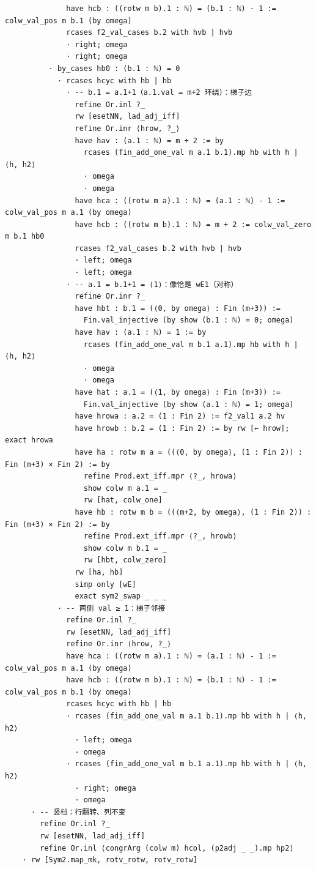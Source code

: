 \documentclass[11pt]{article}
\begin{document}
\begin{lstlisting}
              have hcb : ((rotw m b).1 : ℕ) = (b.1 : ℕ) - 1 := colw_val_pos m b.1 (by omega)
              rcases f2_val_cases b.2 with hvb | hvb
              · right; omega
              · right; omega
          · by_cases hb0 : (b.1 : ℕ) = 0
            · rcases hcyc with hb | hb
              · -- b.1 = a.1+1（a.1.val = m+2 环绕）：梯子边
                refine Or.inl ?_
                rw [esetNN, lad_adj_iff]
                refine Or.inr ⟨hrow, ?_⟩
                have hav : (a.1 : ℕ) = m + 2 := by
                  rcases (fin_add_one_val m a.1 b.1).mp hb with h | ⟨h, h2⟩
                  · omega
                  · omega
                have hca : ((rotw m a).1 : ℕ) = (a.1 : ℕ) - 1 := colw_val_pos m a.1 (by omega)
                have hcb : ((rotw m b).1 : ℕ) = m + 2 := colw_val_zero m b.1 hb0
                rcases f2_val_cases b.2 with hvb | hvb
                · left; omega
                · left; omega
              · -- a.1 = b.1+1 = ⟨1⟩：像恰是 wE1（对称）
                refine Or.inr ?_
                have hbt : b.1 = (⟨0, by omega⟩ : Fin (m+3)) :=
                  Fin.val_injective (by show (b.1 : ℕ) = 0; omega)
                have hav : (a.1 : ℕ) = 1 := by
                  rcases (fin_add_one_val m b.1 a.1).mp hb with h | ⟨h, h2⟩
                  · omega
                  · omega
                have hat : a.1 = (⟨1, by omega⟩ : Fin (m+3)) :=
                  Fin.val_injective (by show (a.1 : ℕ) = 1; omega)
                have hrowa : a.2 = (1 : Fin 2) := f2_val1 a.2 hv
                have hrowb : b.2 = (1 : Fin 2) := by rw [← hrow]; exact hrowa
                have ha : rotw m a = ((⟨0, by omega⟩, (1 : Fin 2)) : Fin (m+3) × Fin 2) := by
                  refine Prod.ext_iff.mpr ⟨?_, hrowa⟩
                  show colw m a.1 = _
                  rw [hat, colw_one]
                have hb : rotw m b = ((⟨m+2, by omega⟩, (1 : Fin 2)) : Fin (m+3) × Fin 2) := by
                  refine Prod.ext_iff.mpr ⟨?_, hrowb⟩
                  show colw m b.1 = _
                  rw [hbt, colw_zero]
                rw [ha, hb]
                simp only [wE]
                exact sym2_swap _ _ _
            · -- 两侧 val ≥ 1：梯子邻接
              refine Or.inl ?_
              rw [esetNN, lad_adj_iff]
              refine Or.inr ⟨hrow, ?_⟩
              have hca : ((rotw m a).1 : ℕ) = (a.1 : ℕ) - 1 := colw_val_pos m a.1 (by omega)
              have hcb : ((rotw m b).1 : ℕ) = (b.1 : ℕ) - 1 := colw_val_pos m b.1 (by omega)
              rcases hcyc with hb | hb
              · rcases (fin_add_one_val m a.1 b.1).mp hb with h | ⟨h, h2⟩
                · left; omega
                · omega
              · rcases (fin_add_one_val m b.1 a.1).mp hb with h | ⟨h, h2⟩
                · right; omega
                · omega
      · -- 竖档：行翻转、列不变
        refine Or.inl ?_
        rw [esetNN, lad_adj_iff]
        refine Or.inl ⟨congrArg (colw m) hcol, (p2adj _ _).mp hp2⟩
    · rw [Sym2.map_mk, rotv_rotw, rotv_rotw]


\end{lstlisting}
\end{document}
